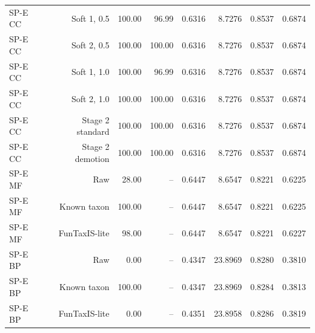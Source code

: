 \begin{longtable}{lrrrrrrr}
SP-E CC & Soft 1, 0.5 & 100.00 & 96.99 & 0.6316 & 8.7276 & 0.8537 & 0.6874 \\
SP-E CC & Soft 2, 0.5 & 100.00 & 100.00 & 0.6316 & 8.7276 & 0.8537 & 0.6874 \\
SP-E CC & Soft 1, 1.0 & 100.00 & 96.99 & 0.6316 & 8.7276 & 0.8537 & 0.6874 \\
SP-E CC & Soft 2, 1.0 & 100.00 & 100.00 & 0.6316 & 8.7276 & 0.8537 & 0.6874 \\
SP-E CC & Stage 2 standard & 100.00 & 100.00 & 0.6316 & 8.7276 & 0.8537 & 0.6874 \\
SP-E CC & Stage 2 demotion & 100.00 & 100.00 & 0.6316 & 8.7276 & 0.8537 & 0.6874 \\
SP-E MF & Raw & 28.00 & -- & 0.6447 & 8.6547 & 0.8221 & 0.6225 \\
SP-E MF & Known taxon & 100.00 & -- & 0.6447 & 8.6547 & 0.8221 & 0.6225 \\
SP-E MF & FunTaxIS-lite & 98.00 & -- & 0.6447 & 8.6547 & 0.8221 & 0.6227 \\
SP-E BP & Raw & 0.00 & -- & 0.4347 & 23.8969 & 0.8280 & 0.3810 \\
SP-E BP & Known taxon & 100.00 & -- & 0.4347 & 23.8969 & 0.8284 & 0.3813 \\
SP-E BP & FunTaxIS-lite & 0.00 & -- & 0.4351 & 23.8958 & 0.8286 & 0.3819 \\
\bottomrule
\end{longtable}
\endgroup
